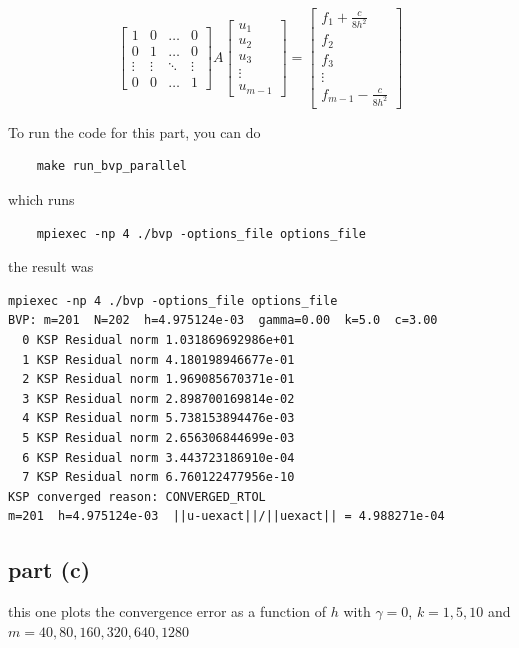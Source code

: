 \documentclass[12pt]{article}
\begin{document}
\begin{equation}
    \begin{bmatrix}
    1 & 0 & \ldots & 0 \\
    0 & 1 & \ldots & 0 \\
    \vdots & \vdots & \ddots & \vdots \\
    0 & 0 & \ldots & 1
    \end{bmatrix} A \begin{bmatrix} u_1 \\ u_2 \\ u_3 \\ \vdots \\ u_{m-1} \end{bmatrix} = \begin{bmatrix} f_1 + \frac{c}{8h^2} \\ f_2 \\ f_3 \\ \vdots \\ f_{m-1} - \frac{c}{8h^2} \end{bmatrix}
\end{equation}

To run the code for this part, you can do 
\begin{verbatim}
    make run_bvp_parallel
\end{verbatim}
which runs 
\begin{verbatim}
    mpiexec -np 4 ./bvp -options_file options_file
\end{verbatim}
    
the result was 
\begin{verbatim}
mpiexec -np 4 ./bvp -options_file options_file 
BVP: m=201  N=202  h=4.975124e-03  gamma=0.00  k=5.0  c=3.00
  0 KSP Residual norm 1.031869692986e+01
  1 KSP Residual norm 4.180198946677e-01
  2 KSP Residual norm 1.969085670371e-01
  3 KSP Residual norm 2.898700169814e-02
  4 KSP Residual norm 5.738153894476e-03
  5 KSP Residual norm 2.656306844699e-03
  6 KSP Residual norm 3.443723186910e-04
  7 KSP Residual norm 6.760122477956e-10
KSP converged reason: CONVERGED_RTOL
m=201  h=4.975124e-03  ||u-uexact||/||uexact|| = 4.988271e-04
\end{verbatim}

\subsection{part (c)}
this one plots the convergence error as a function of $h$ with $\gamma = 0$, $k=1,5,10$ and $m = 40, 80, 160, 320, 640, 1280$
\end{document}
